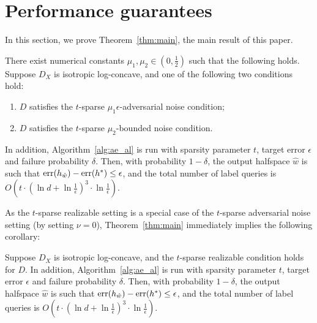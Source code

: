 \section{Performance guarantees}

In this section, we prove Theorem~\ref{thm:main}, the main result of this paper. %
\begin{theorem}
  There exist numerical constants $\mu_1, \mu_2 \in (0, \frac 1 2)$ such that the following holds.
  Suppose $D_X$ is isotropic log-concave, and one of the following two conditions hold:
  \begin{enumerate}
    \item $D$ satisfies the $t$-sparse $\mu_1\epsilon$-adversarial noise condition;
    \item $D$ satisfies the $t$-sparse $\mu_2$-bounded noise condition.
  \end{enumerate}
	In addition, Algorithm~\ref{alg:ae_al} is run with sparsity parameter $t$, target error $\epsilon$ and failure probability $\delta$.
  Then, with probability $1-\delta$, the output halfspace $\hat{w}$ is such that
  $\operatorname{err}(h_{\hat{w}}) - \operatorname{err}(h^*) \leq \epsilon$,
  and the total number of label queries is $O( t \cdot (\ln d + \ln \frac 1 \epsilon)^3 \cdot \ln \frac 1 \epsilon )$.
  \label{thm:main}
\end{theorem}

As the $t$-sparse realizable setting is a special case of the $t$-sparse adversarial noise setting (by setting $\nu = 0$), Theorem~\ref{thm:main} immediately implies the
following corollary:
\begin{corollary}
	Suppose $D_X$ is isotropic log-concave, and the $t$-sparse realizable condition holds for $D$.
  In addition, Algorithm~\ref{alg:ae_al} is run with sparsity parameter $t$, target error $\epsilon$ and failure probability $\delta$.
  Then, with probability $1-\delta$, the output halfspace $\hat{w}$ is such that
  $\operatorname{err}(h_{\hat{w}}) - \operatorname{err}(h^*) \leq \epsilon$,
  and the total number of label queries is $O( t \cdot (\ln d + \ln \frac 1 \epsilon)^3 \cdot \ln \frac 1 \epsilon )$.
	\label{cor:main}
\end{corollary}

